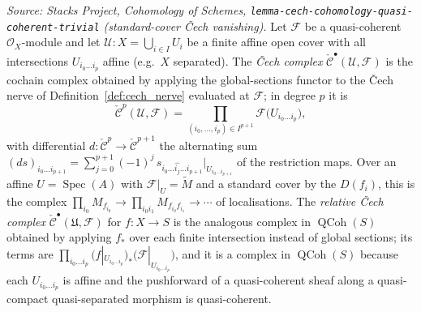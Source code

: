 \begin{definition}

  \label{def:cech_complex}
  \textit{Source: Stacks Project, Cohomology of Schemes,
  \texttt{lemma-cech-cohomology-quasi-coherent-trivial} (standard-cover {\v C}ech
  vanishing).}
  Let \(\mathcal{F}\) be a quasi-coherent \(\mathcal{O}_X\)-module and let
  \(\mathcal{U} : X = \bigcup_{i \in I} U_i\) be a finite affine open cover with
  all intersections \(U_{i_0 \ldots i_p}\) affine (e.g.\ \(X\) separated). The
  \emph{{\v C}ech complex} \(\check{\mathcal{C}}^\bullet(\mathcal{U}, \mathcal{F})\)
  is the cochain complex obtained by applying the global-sections functor to the
  {\v C}ech nerve of Definition~\ref{def:cech_nerve} evaluated at \(\mathcal{F}\);
  in degree \(p\) it is
  \[
    \check{\mathcal{C}}^p(\mathcal{U}, \mathcal{F})
      = \prod_{(i_0, \ldots, i_p) \in I^{p+1}}
        \mathcal{F}\bigl(U_{i_0 \ldots i_p}\bigr),
  \]
  with differential \(d : \check{\mathcal{C}}^p \to \check{\mathcal{C}}^{p+1}\) the
  alternating sum \((d s)_{i_0 \ldots i_{p+1}} = \sum_{j=0}^{p+1} (-1)^j\,
  s_{i_0 \ldots \widehat{i_j} \ldots i_{p+1}}|_{U_{i_0 \ldots i_{p+1}}}\) of the
  restriction maps. Over an affine \(U = \operatorname{Spec}(A)\) with
  \(\mathcal{F}|_U = \widetilde{M}\) and a standard cover by the
  \(D(f_i)\), this is the complex
  \(\prod_{i_0} M_{f_{i_0}} \to \prod_{i_0 i_1} M_{f_{i_0} f_{i_1}} \to \cdots\) of
  localisations. The \emph{relative {\v C}ech complex} \(\check{\mathcal{C}}^\bullet
  (\mathfrak{U}, \mathcal{F})\) for \(f : X \to S\) is the analogous complex in
  \(\operatorname{QCoh}(S)\) obtained by applying \(f_*\) over each finite
  intersection instead of global sections; its terms are
  \(\prod_{i_0 \ldots i_p} (f|_{U_{i_0 \ldots i_p}})_*
  \bigl(\mathcal{F}|_{U_{i_0 \ldots i_p}}\bigr)\), and it is a complex in
  \(\operatorname{QCoh}(S)\) because each \(U_{i_0 \ldots i_p}\) is affine and the
  pushforward of a quasi-coherent sheaf along a quasi-compact quasi-separated
  morphism is quasi-coherent.
\end{definition}


